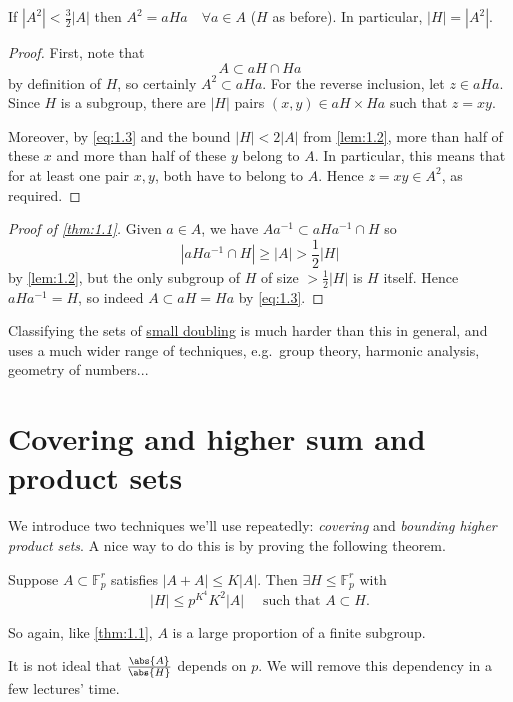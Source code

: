\documentclass{article}
\newcommand{\ratio}[2]{\frac{\abs{#1}}{\abs{#2}}}
\numberwithin{equation}{section}
\begin{document}
\begin{nlemma}
  If $|A^2| < \frac{3}{2} |A|$ then $A^2 = a H a \quad \forall a \in A$ ($H$ as before). In particular, $|H| = |A^2|$.
\end{nlemma}
\begin{proof}
  First, note that
  \begin{equation}
    A \subset aH \cap Ha \label{eq:1.3}
  \end{equation}
  by definition of $H$, so certainly $A^2 \subset a Ha$. For the reverse inclusion, let $z \in a H a$.
  Since $H$ is a subgroup, there are $|H|$ pairs $(x,y) \in aH \times Ha$ such that $z = xy$.

  Moreover, by \eqref{eq:1.3} and the bound $|H| < 2|A|$ from \cref{lem:1.2}, more than half of these $x$ and more than half of these $y$ belong to $A$.
  In particular, this means that for at least one pair $x,y$, both have to belong to $A$.
  Hence $z = xy \in A^2$, as required.
\end{proof}
\begin{proof}[Proof of \cref{thm:1.1}]
  Given $a \in A$, we have $A a^{-1} \subset a H a^{-1} \cap H$ so
  \begin{equation*}|a H a^{-1} \cap H| \geq |A| > \frac{1}{2} |H|\end{equation*}
  by \cref{lem:1.2}, but the only subgroup of $H$ of size $> \frac{1}{2}|H|$ is $H$ itself.
  Hence $a H a^{-1} = H$, so indeed $A \subset a H = Ha$ by \eqref{eq:1.3}.
\end{proof}
Classifying the sets of \hyperlink{def:doubling}{small doubling} is much harder than this in general, and uses a much wider range of techniques, e.g.\ group theory, harmonic analysis, geometry of numbers...

\clearpage
\section{Covering and higher sum and product sets}
\newlec
We introduce two techniques we'll use repeatedly: \emph{covering} and \emph{bounding higher product sets}.
A nice way to do this is by proving the following theorem.
\begin{nthm}[Ruzsa]\label{thm:2.1}
  Suppose $A \subset \mathbb{F}_p^r$ satisfies $|A+A| \leq K|A|$. Then $\exists H \leq \mathbb{F}_p^r$ with
  \begin{equation*}
    |H| \leq p^{K^4} K^2 |A| \quad \text{ such that } A \subset H.
  \end{equation*}
\end{nthm}
So again, like \cref{thm:1.1}, $A$ is a large proportion of a finite subgroup.
\begin{remark}
  It is not ideal that $\ratio{A}{H}$ depends on $p$. We will remove this dependency in a few lectures' time.
\end{remark}
\end{document}
